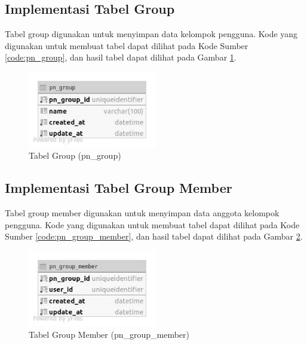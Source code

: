 \subsection{Implementasi Tabel Group}
\par Tabel group digunakan untuk menyimpan data kelompok pengguna. Kode yang digunakan untuk membuat tabel dapat dilihat pada Kode Sumber \ref{code:pn_group}, dan hasil tabel dapat dilihat pada Gambar \ref{tabel_pn_group}.

\begin{figure}[H]
    \centering\includegraphics[width=0.5\textwidth]{bab4/figures/tabel_pn_group.jpg}
    \caption{Tabel Group (pn\_group)}
    \label{tabel_pn_group}
\end{figure}

\subsection{Implementasi Tabel Group Member}
\par Tabel group member digunakan untuk menyimpan data anggota kelompok pengguna. Kode yang digunakan untuk membuat tabel dapat dilihat pada Kode Sumber \ref{code:pn_group_member}, dan hasil tabel dapat dilihat pada Gambar \ref{tabel_pn_group_member}.

\begin{figure}[H]
    \centering\includegraphics[width=0.5\textwidth]{bab4/figures/tabel_pn_group_member.jpg}
    \caption{Tabel Group Member (pn\_group\_member)}
    \label{tabel_pn_group_member}
\end{figure}

